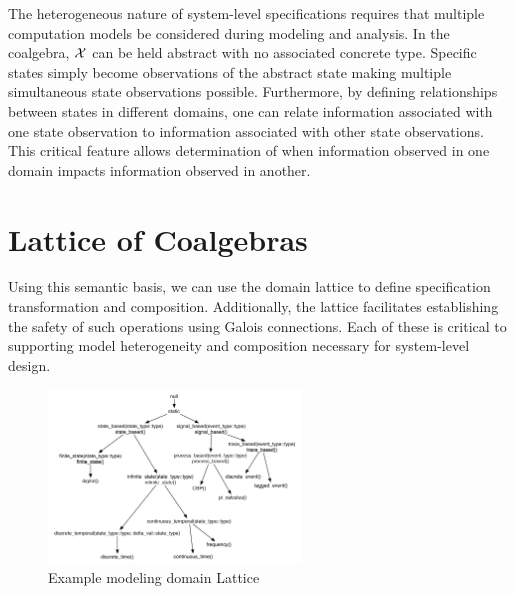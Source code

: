 \documentclass[12pt]{article}
\begin{document}
The heterogeneous nature of system-level specifications requires that
multiple computation models be considered during modeling and
analysis.  In the coalgebra, $\mathcal X$ can be held abstract with no
associated concrete type.  Specific states simply become observations
of the abstract state making multiple simultaneous state observations
possible.  Furthermore, by defining relationships between states in
different domains, one can relate information associated with one
state observation to information associated with other state
observations.  This critical feature allows determination of when
information observed in one domain impacts information observed in
another.

\section{Lattice of Coalgebras}

Using this semantic basis, we can use the domain lattice to define
specification transformation and composition.  Additionally, the
lattice facilitates establishing the safety of such operations using
Galois connections.  Each of these is critical to supporting model
heterogeneity and composition necessary for system-level design.


\begin{figure}[hbtp]
  \centering
  \includegraphics[width=0.6\textwidth]{figures/semi-lattice-detailed.pdf}
  \caption{Example modeling domain Lattice}
  \label{fig:semi-lattice-detailed}
\end{figure}
\end{document}
